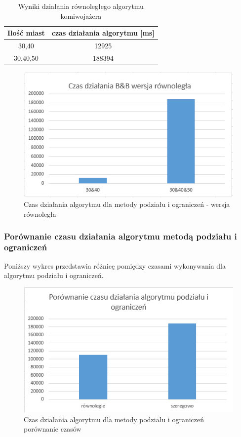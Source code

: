 \documentclass{article}
\begin{document}
		\begin{table}[H]
			\centering
			\caption{Wyniki działania równoległego algorytmu komiwojażera}
			\begin{tabular}{|c|c|}
				
				\hline Ilość miast  & czas działania algorytmu [ms] \\ 
				\hline  30,40 & 12925 \\ 
				\hline  30,40,50 & 188394 \\ 
				\hline 
			\end{tabular} 
		\end{table}
	
	 	
	\begin{figure}[H]
		\centering
		\includegraphics[width=0.9\linewidth]{bbR}
		\caption{ Czas działania algorytmu dla metody podziału i ograniczeń - wersja równoległa }
	\end{figure}
	


	\subsubsection{Porównanie czasu działania algorytmu metodą podziału i ograniczeń}
	Poniższy wykres przedstawia różnicę pomiędzy czasami wykonywania dla algorytmu podziału i ograniczeń. 
		
		\begin{figure}[H]
			\centering
			\includegraphics[width=0.9\linewidth]{bbRvsS}
			\caption{ Czas działania algorytmu dla metody podziału i ograniczeń porównanie czasów }
		\end{figure}
		
\end{document}
